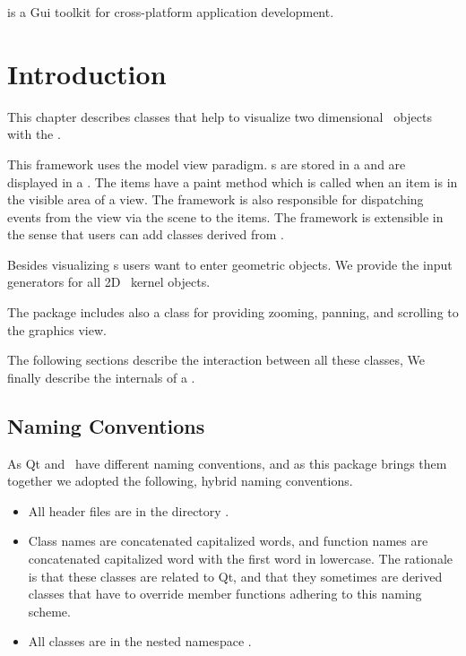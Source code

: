 

 is a {\sc Gui} toolkit for
cross-platform application development.

\section{Introduction}

This chapter describes classes that help to visualize two dimensional \cgal\ objects
with the .

This framework uses the model view paradigm. s are stored in a 
and are displayed in a . The items 
have a paint method which is called when an item is in the visible area of a view.
The framework is also responsible for dispatching events from the view
via the scene to the items. The framework is extensible in the sense
that users can add classes derived from .

Besides visualizing s users want to enter geometric objects.
We provide the input generators for all 2D \cgal\ kernel objects.

The package includes also a class for providing zooming, panning, and scrolling
to the graphics view.


The following sections describe the interaction between all these classes,
We finally describe the internals of a .

\subsection{Naming Conventions}

As Qt and \cgal\ have different naming conventions, and as this package
brings them together we adopted the following, hybrid naming conventions.

\begin{itemize}
\item All header files are in the directory . 
\item Class names are concatenated capitalized words, and function names are
      concatenated capitalized word with the first word in lowercase. The rationale is that
      these classes are related to Qt, and that they sometimes are derived
      classes that have to override member functions adhering to this naming scheme.
\item All classes are in the nested namespace .
\end{itemize}
 


